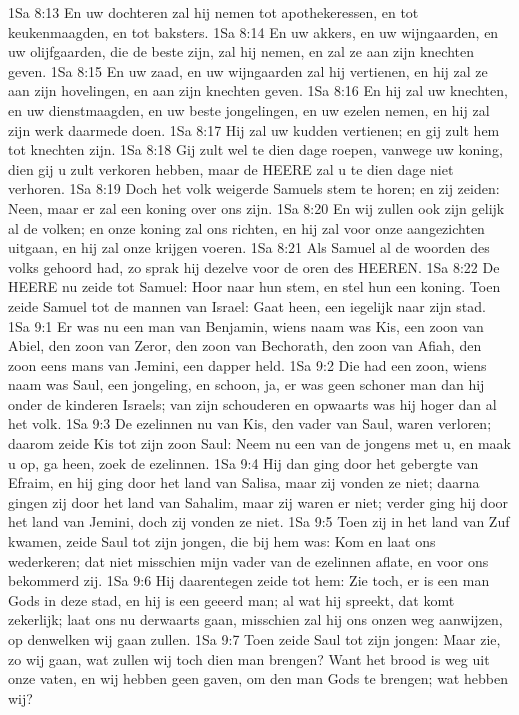 1Sa 8:13  En uw dochteren zal hij nemen tot apothekeressen, en tot keukenmaagden, en tot baksters.
1Sa 8:14  En uw akkers, en uw wijngaarden, en uw olijfgaarden, die de beste zijn, zal hij nemen, en zal ze aan zijn knechten geven.
1Sa 8:15  En uw zaad, en uw wijngaarden zal hij vertienen, en hij zal ze aan zijn hovelingen, en aan zijn knechten geven.
1Sa 8:16  En hij zal uw knechten, en uw dienstmaagden, en uw beste jongelingen, en uw ezelen nemen, en hij zal zijn werk daarmede doen.
1Sa 8:17  Hij zal uw kudden vertienen; en gij zult hem tot knechten zijn.
1Sa 8:18  Gij zult wel te dien dage roepen, vanwege uw koning, dien gij u zult verkoren hebben, maar de HEERE zal u te dien dage niet verhoren.
1Sa 8:19  Doch het volk weigerde Samuels stem te horen; en zij zeiden: Neen, maar er zal een koning over ons zijn.
1Sa 8:20  En wij zullen ook zijn gelijk al de volken; en onze koning zal ons richten, en hij zal voor onze aangezichten uitgaan, en hij zal onze krijgen voeren.
1Sa 8:21  Als Samuel al de woorden des volks gehoord had, zo sprak hij dezelve voor de oren des HEEREN.
1Sa 8:22  De HEERE nu zeide tot Samuel: Hoor naar hun stem, en stel hun een koning. Toen zeide Samuel tot de mannen van Israel: Gaat heen, een iegelijk naar zijn stad.
1Sa 9:1  Er was nu een man van Benjamin, wiens naam was Kis, een zoon van Abiel, den zoon van Zeror, den zoon van Bechorath, den zoon van Afiah, den zoon eens mans van Jemini, een dapper held.
1Sa 9:2  Die had een zoon, wiens naam was Saul, een jongeling, en schoon, ja, er was geen schoner man dan hij onder de kinderen Israels; van zijn schouderen en opwaarts was hij hoger dan al het volk.
1Sa 9:3  De ezelinnen nu van Kis, den vader van Saul, waren verloren; daarom zeide Kis tot zijn zoon Saul: Neem nu een van de jongens met u, en maak u op, ga heen, zoek de ezelinnen.
1Sa 9:4  Hij dan ging door het gebergte van Efraim, en hij ging door het land van Salisa, maar zij vonden ze niet; daarna gingen zij door het land van Sahalim, maar zij waren er niet; verder ging hij door het land van Jemini, doch zij vonden ze niet.
1Sa 9:5  Toen zij in het land van Zuf kwamen, zeide Saul tot zijn jongen, die bij hem was: Kom en laat ons wederkeren; dat niet misschien mijn vader van de ezelinnen aflate, en voor ons bekommerd zij.
1Sa 9:6  Hij daarentegen zeide tot hem: Zie toch, er is een man Gods in deze stad, en hij is een geeerd man; al wat hij spreekt, dat komt zekerlijk; laat ons nu derwaarts gaan, misschien zal hij ons onzen weg aanwijzen, op denwelken wij gaan zullen.
1Sa 9:7  Toen zeide Saul tot zijn jongen: Maar zie, zo wij gaan, wat zullen wij toch dien man brengen? Want het brood is weg uit onze vaten, en wij hebben geen gaven, om den man Gods te brengen; wat hebben wij?
